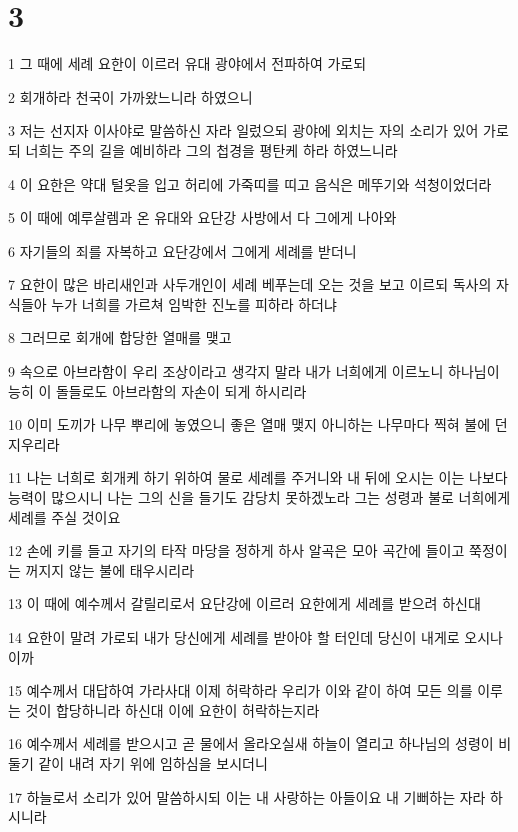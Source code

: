 \chapter{3}

\par 1 그 때에 세례 요한이 이르러 유대 광야에서 전파하여 가로되
\par 2 회개하라 천국이 가까왔느니라 하였으니
\par 3 저는 선지자 이사야로 말씀하신 자라 일렀으되 광야에 외치는 자의 소리가 있어 가로되 너희는 주의 길을 예비하라 그의 첩경을 평탄케 하라 하였느니라
\par 4 이 요한은 약대 털옷을 입고 허리에 가죽띠를 띠고 음식은 메뚜기와 석청이었더라
\par 5 이 때에 예루살렘과 온 유대와 요단강 사방에서 다 그에게 나아와
\par 6 자기들의 죄를 자복하고 요단강에서 그에게 세례를 받더니
\par 7 요한이 많은 바리새인과 사두개인이 세례 베푸는데 오는 것을 보고 이르되 독사의 자식들아 누가 너희를 가르쳐 임박한 진노를 피하라 하더냐
\par 8 그러므로 회개에 합당한 열매를 맺고
\par 9 속으로 아브라함이 우리 조상이라고 생각지 말라 내가 너희에게 이르노니 하나님이 능히 이 돌들로도 아브라함의 자손이 되게 하시리라
\par 10 이미 도끼가 나무 뿌리에 놓였으니 좋은 열매 맺지 아니하는 나무마다 찍혀 불에 던지우리라
\par 11 나는 너희로 회개케 하기 위하여 물로 세례를 주거니와 내 뒤에 오시는 이는 나보다 능력이 많으시니 나는 그의 신을 들기도 감당치 못하겠노라 그는 성령과 불로 너희에게 세례를 주실 것이요
\par 12 손에 키를 들고 자기의 타작 마당을 정하게 하사 알곡은 모아 곡간에 들이고 쭉정이는 꺼지지 않는 불에 태우시리라
\par 13 이 때에 예수께서 갈릴리로서 요단강에 이르러 요한에게 세례를 받으려 하신대
\par 14 요한이 말려 가로되 내가 당신에게 세례를 받아야 할 터인데 당신이 내게로 오시나이까
\par 15 예수께서 대답하여 가라사대 이제 허락하라 우리가 이와 같이 하여 모든 의를 이루는 것이 합당하니라 하신대 이에 요한이 허락하는지라
\par 16 예수께서 세례를 받으시고 곧 물에서 올라오실새 하늘이 열리고 하나님의 성령이 비둘기 같이 내려 자기 위에 임하심을 보시더니
\par 17 하늘로서 소리가 있어 말씀하시되 이는 내 사랑하는 아들이요 내 기뻐하는 자라 하시니라

